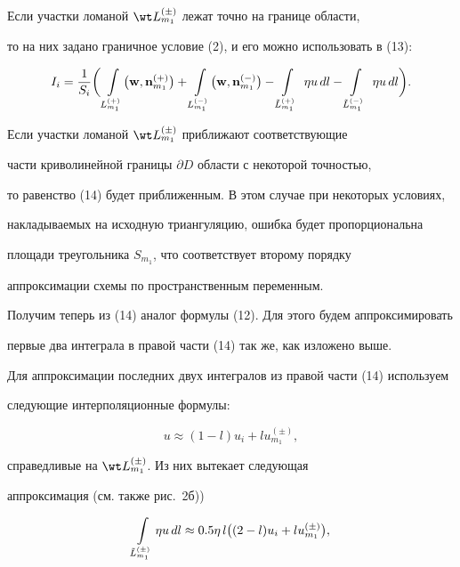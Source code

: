 Если участки ломаной $\wt L{}_{m_1}^{(\pm)}$ лежат точно на границе области,


то на них задано граничное условие (2), и его можно использовать в (13):


\begin{equation}


\lEq{15}


I_i = \frac{1}{S_i}\bigg(


\int\limits_{L_{m_1}^{(+)}}\bigl({\bold w},{\bold n}_{m_1}^{(+)}\bigr) + 


\int\limits_{L_{m_1}^{(-)}}\bigl({\bold w},{\bold n}_{m_1}^{(-)}\bigr) -


\int\limits_{\tilde L_{m_1}^{(+)}}{~}\eta u\,dl - 


\int\limits_{\tilde L_{m_1}^{(-)}}{~}\eta u\,dl


\bigg).


\end{equation}


Если участки ломаной $\wt L{}_{m_1}^{(\pm)}$ приближают соответствующие


части криволинейной границы $\partial D$ области с некоторой точностью,


то равенство (14) будет приближенным. В этом случае при некоторых условиях,


накладываемых на исходную триангуляцию, ошибка будет пропорциональна


площади треугольника $S_{m_1}$, что соответствует второму порядку


аппроксимации схемы по пространственным переменным.





Получим теперь из (14) аналог формулы (12). Для этого будем аппроксимировать


первые два интеграла в правой части (14) так же, как изложено выше.


Для аппроксимации последних двух интегралов из правой части (14) используем


следующие интерполяционные формулы:


$$


u \approx (1-l) u_i + l u_{m_1}^{(\pm)},


$$


справедливые на $\wt L{}_{m_1}^{(\pm)}$. Из них вытекает следующая


аппроксимация (см. также рис.~2б))


\begin{equation}


\lEq{16}


\int\limits_{\tilde L_{m_1}^{(\pm)}}\eta u\,dl \approx


0.5 \eta\, l \big((2-l) u_i + l u_{m_1}^{(\pm)}\big),


\end{equation}


